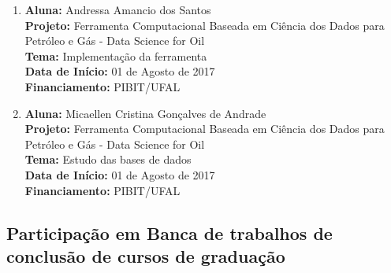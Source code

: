 \documentclass[a4paper,oneside,10pt]{article}
\begin{document}
\begin{enumerate}
  \item    \textbf{Aluna:} Andressa Amancio dos Santos \mbox{} \\
             \textbf{Projeto:} Ferramenta  Computacional Baseada em Ciência dos Dados para Petróleo e Gás - Data Science for Oil \\
             \textbf{Tema:} Implementação da ferramenta \\
             \textbf{Data de Início:} 01 de Agosto de 2017\\
             \textbf{Financiamento:} PIBIT/UFAL
             
 \item    \textbf{Aluna:} Micaellen Cristina Gonçalves de Andrade \mbox{} \\
             \textbf{Projeto:} Ferramenta  Computacional Baseada em Ciência dos Dados para Petróleo e Gás - Data Science for Oil \\
             \textbf{Tema:} Estudo das bases de dados \\
             \textbf{Data de Início:} 01 de Agosto de 2017\\
             \textbf{Financiamento:} PIBIT/UFAL
\end{enumerate}


\subsection{Participação em Banca de trabalhos de conclusão de cursos de graduação}
\vspace{0.3cm}
\end{document}
